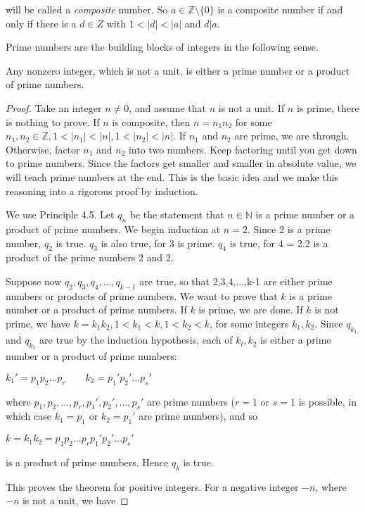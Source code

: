 \documentclass[11pt]{amsbook}
\begin{document}
	
will be called a \textit{composite} number. So $a \in \mathbb{Z}\setminus\{0\}$ is a composite number if and only if there is a $d \in Z$ with $1 < |d| < |a|$ and $d|a$.

Prime numbers are the building blocks of integers in the following sense.

	\begin{thm}
	Any nonzero integer, which is not a unit, is either a prime number or a product of prime numbers. 
	\end{thm}
	
    \begin{proof}
    Take an integer $n \neq 0$, and assume that $n$ is not a  unit. If $n$ is prime, there is nothing to prove. If $n$ is composite, then $n = n_1n_2$ for some $n_1,n_2 \in \mathbb{Z}, 1<|n_1|<|n|,1<|n_2|<|n|$. If $n_1$ and $n_2$ are prime, we are through. Otherwise, factor $n_1$ and $n_2$ into two numbers. Keep factoring until you get down to prime numbers. Since the factors get smaller and smaller in absolute value, we will teach prime numbers at the end. This is the basic idea and we make this reasoning into a rigorous proof by induction.

    We use Principle 4.5. Let $q_n$ be the statement that $n \in \mathbb{N}$ is a prime number or a product of prime numbers. We begin induction at $n = 2$. Since 2 is a  prime number, $q_2$ is true. $q_3$ is also true, for 3 is prime. $q_4$ is true, for 4 = 2.2 is a product of the prime numbers 2 and 2.

    Suppose now $q_2,q_3,q_4,...,q_{k-1}$ are true, so that 2,3,4,...,k-1 are either prime numbers or products of prime numbers. We want to prove that $k$ is a prime number or a product of prime numbers. If $k$ is prime, we are done. If $k$ is not prime, we have $k=k_1k_2,1<k_1<k,1<k_2<k$, for some integers $k_1,k_2$. Since $q_{k_1}$ and $q_{k_2}$ are true by the induction hypothesis, each of $k_l, k_2$ is either a prime number or a product of prime numbers:
    
		\begin{center}
		 $k_1'=p_1p_2...p_r \qquad k_2 =p_1'p_2'...p_s'$
		\end{center}

    where $p_1,p_2,...,p_r,p_1',p_2',...,p_s'$ are prime numbers ($r = 1$ or $s = 1$ is possible, in which case $k_1 = p_1$ or $k_2 = p_1'$ are prime numbers), and so
    
	    \begin{center}
		 $k = k_1k_2 = p_1p_2...p_rp_1'p_2'...p_s'$
		\end{center}
        
is a product of prime numbers. Hence $q_k$ is true.

This proves the theorem for positive integers. For a negative integer $-n$, where $-n$ is not a  unit, we have
    \end{proof}
\end{document}
